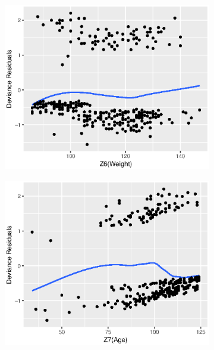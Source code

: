 \documentclass{article}
\begin{document}
\begin{enumerate}[leftmargin = 0 em, label = \arabic*., font = \bfseries]
\begin{enumerate}
\begin{figure}[!htb]
			\begin{subfigure}[b]{0.3\textwidth}
			\includegraphics[width = \textwidth]{dz6.eps}
			\end{subfigure}%
			\begin{subfigure}[b]{0.3\textwidth}
			\includegraphics[width = \textwidth]{dz7.eps}
			\end{subfigure}%
			\begin{subfigure}[b]{0.3\textwidth}

\end{subfigure}
\end{figure}
\end{enumerate}
\end{enumerate}
\end{document}

